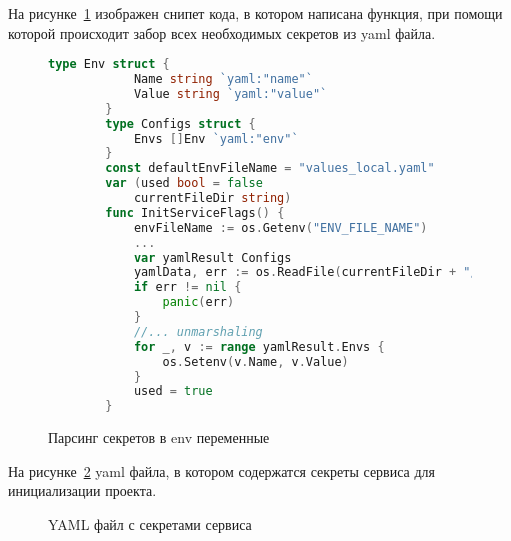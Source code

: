 
На рисунке~\ref{flags-func-add} изображен снипет кода, в котором написана функция, при помощи которой происходит забор всех необходимых секретов из yaml файла.

\begin{figure}
    \begin{lstlisting}[language=go]
        type Env struct {
            Name string `yaml:"name"`
            Value string `yaml:"value"`
        }
        type Configs struct {
            Envs []Env `yaml:"env"`
        }
        const defaultEnvFileName = "values_local.yaml"
        var (used bool = false
            currentFileDir string)
        func InitServiceFlags() {
            envFileName := os.Getenv("ENV_FILE_NAME")
            ...
            var yamlResult Configs
            yamlData, err := os.ReadFile(currentFileDir + "/" + envFileName)
            if err != nil {
                panic(err)
            }
            //... unmarshaling
            for _, v := range yamlResult.Envs {
                os.Setenv(v.Name, v.Value)
            }
            used = true
        }
    \end{lstlisting}
    \caption{Парсинг секретов в env переменные}
    \label{flags-func-add}
\end{figure}

На рисунке~\ref{yaml-secret-add} yaml файла, в котором содержатся секреты сервиса для инициализации проекта.

\begin{figure}
    
    \caption{YAML файл с секретами сервиса}
    \label{yaml-secret-add}
\end{figure}